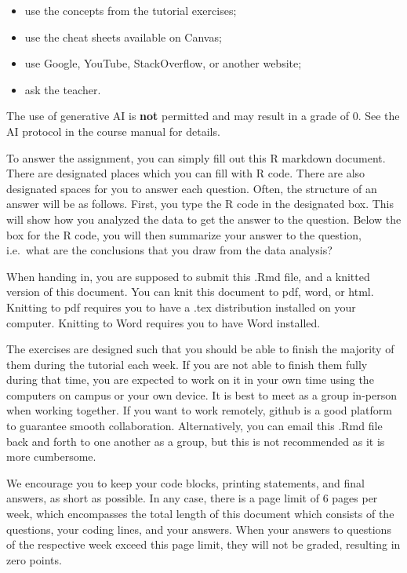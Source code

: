 \documentclass[
]{article}
\providecommand{\tightlist}{%
  \setlength{\itemsep}{0pt}\setlength{\parskip}{0pt}}
\begin{document}
\begin{itemize}
\tightlist
\item
  use the concepts from the tutorial exercises;
\item
  use the cheat sheets available on Canvas;
\item
  use Google, YouTube, StackOverflow, or another website;
\item
  ask the teacher.
\end{itemize}

The use of generative AI is \textbf{not} permitted and may result in a
grade of 0. See the AI protocol in the course manual for details.

To answer the assignment, you can simply fill out this R markdown
document. There are designated places which you can fill with R code.
There are also designated spaces for you to answer each question. Often,
the structure of an answer will be as follows. First, you type the R
code in the designated box. This will show how you analyzed the data to
get the answer to the question. Below the box for the R code, you will
then summarize your answer to the question, i.e.~what are the
conclusions that you draw from the data analysis?

When handing in, you are supposed to submit this .Rmd file, and a
knitted version of this document. You can knit this document to pdf,
word, or html. Knitting to pdf requires you to have a .tex distribution
installed on your computer. Knitting to Word requires you to have Word
installed.

The exercises are designed such that you should be able to finish the
majority of them during the tutorial each week. If you are not able to
finish them fully during that time, you are expected to work on it in
your own time using the computers on campus or your own device. It is
best to meet as a group in-person when working together. If you want to
work remotely, github is a good platform to guarantee smooth
collaboration. Alternatively, you can email this .Rmd file back and
forth to one another as a group, but this is not recommended as it is
more cumbersome.

We encourage you to keep your code blocks, printing statements, and
final answers, as short as possible. In any case, there is a page limit
of 6 pages per week, which encompasses the total length of this document
which consists of the questions, your coding lines, and your answers.
When your answers to questions of the respective week exceed this page
limit, they will not be graded, resulting in zero points.
\end{document}
